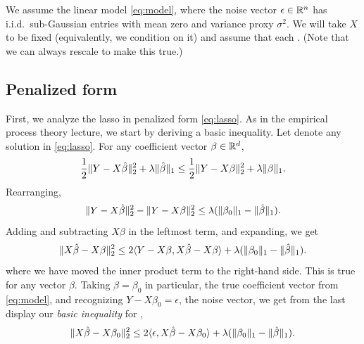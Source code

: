 \documentclass{article}
\begin{document}
We assume the linear model \eqref{eq:model}, where the noise vector $\epsilon
\in \mathbb{R}^n$ has i.i.d.\ sub-Gaussian entries with mean zero and variance proxy  
$\sigma^2$. We will take $X$ to be fixed (equivalently, we condition on it) and
assume that each . (Note that
we can always rescale to make this true.)

\subsection{Penalized form}

First, we analyze the lasso in penalized form \eqref{eq:lasso}. As in the
empirical process theory lecture, we start by deriving a basic inequality. Let
\smash{$\hbeta$} denote any solution in \eqref{eq:lasso}. For any coefficient
vector $\beta \in \mathbb{R}^d$,  
\[
\frac{1}{2} \|Y - X\hat{\beta}\|_2^2 + \lambda\|\hat{\beta}\|_1 
\leq \frac{1}{2} \|Y - X\beta\|_2^2 + \lambda\|\beta\|_1.
\]
Rearranging, 
\[
\|Y - X\hat{\beta}\|_2^2 - \|Y - X\beta\|_2^2 \leq \lambda (\|\beta_0\|_1 -
\|\hat{\beta}\|_1).  
\]
Adding and subtracting $X\beta$ in the leftmost term, and expanding, we get  
\[
\|X\hat{\beta} - X\beta\|_2^2 \leq 2 \langle Y-X\beta, X\hat{\beta} - X\beta \rangle + 
\lambda (\|\beta_0\|_1 - \|\hat{\beta}\|_1). 
\]
where we have moved the inner product term to the right-hand side. This is true
for any vector $\beta$. Taking $\beta = \beta_0$ in particular, the true
coefficient vector from \eqref{eq:model}, and recognizing $Y - X\beta_0 =
\epsilon$, the noise vector, we get from the last display our \emph{basic
  inequality} for \smash{$\hbeta$}, 
\begin{equation}
\label{eq:basic_ineq_penalized1}
\|X\hat{\beta} - X\beta_0\|_2^2  \leq 2 \langle \epsilon, X\hat{\beta} - X\beta_0 \rangle
+ \lambda (\|\beta_0\|_1 - \|\hat{\beta}\|_1). 
\end{equation}
\end{document}
